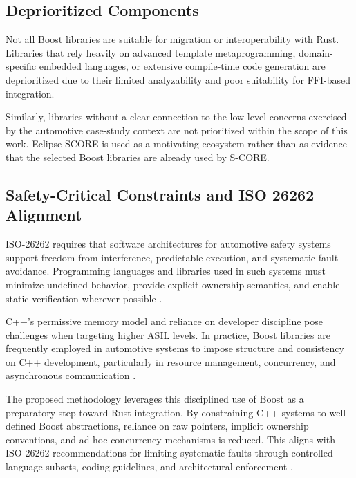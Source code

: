         \subsection{Deprioritized Components}

        Not all Boost libraries are suitable for migration or interoperability with
        Rust. Libraries that rely heavily on advanced template metaprogramming,
        domain-specific embedded languages, or extensive compile-time code generation
        are deprioritized due to their limited analyzability and poor suitability for
        FFI-based integration.

        Similarly, libraries without a clear connection to the low-level concerns
        exercised by the automotive case-study context are not prioritized within the
        scope of this work. Eclipse \gls{SCORE} is used as a motivating ecosystem rather
        than as evidence that the selected Boost libraries are already used by S-CORE.

        \subsection{Safety-Critical Constraints and ISO 26262 Alignment}

        ISO-26262 requires that software architectures for automotive safety systems
        support freedom from interference, predictable execution, and systematic fault
        avoidance. Programming languages and libraries used in such systems must
        minimize undefined behavior, provide explicit ownership semantics, and enable
        static verification wherever possible \parencite{iso26262}.

        C++’s permissive memory model and reliance on developer discipline pose
        challenges when targeting higher \gls{ASIL} levels. In practice, Boost libraries
        are frequently employed in automotive systems to impose structure and
        consistency on C++ development, particularly in resource management,
        concurrency, and asynchronous communication \parencite{synopsys_asil}.

        The proposed methodology leverages this disciplined use of Boost as a
        preparatory step toward Rust integration. By constraining C++ systems to
        well-defined Boost abstractions, reliance on raw pointers, implicit ownership
        conventions, and ad hoc concurrency mechanisms is reduced. This aligns with
        ISO-26262 recommendations for limiting systematic faults through controlled
        language subsets, coding guidelines, and architectural enforcement
        \parencite{iso26262}.

